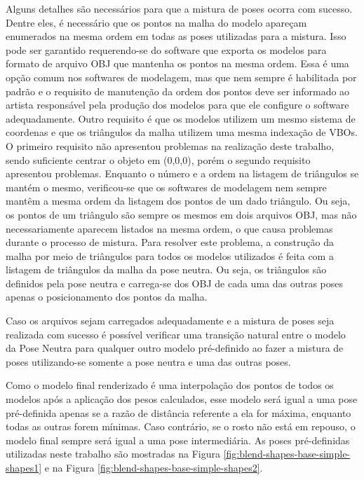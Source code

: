 Alguns detalhes são necessários para que a mistura de poses ocorra com sucesso.
Dentre eles, é necessário que os pontos na malha do modelo apareçam enumerados
na mesma ordem em todas as poses utilizadas para a mistura. Isso pode ser
garantido requerendo-se do software que exporta os modelos para formato de
arquivo OBJ que mantenha os pontos na mesma ordem. Essa é uma opção comum nos
softwares de modelagem, mas que nem sempre é habilitada por padrão e o requisito
de manutenção da ordem dos pontos deve ser informado ao artista responsável pela
produção dos modelos para que ele configure o software adequadamente. Outro
requisito é que os modelos utilizem um mesmo sistema de coordenas e que os
triângulos da malha utilizem uma mesma indexação de VBOs. O primeiro requisito
não apresentou problemas na realização deste trabalho, sendo suficiente centrar
o objeto em (0,0,0), porém o segundo requisito apresentou problemas. Enquanto o
número e a ordem na listagem de triângulos se mantém o mesmo, verificou-se que
os softwares de modelagem nem sempre mantêm a mesma ordem da listagem dos pontos
de um dado triângulo. Ou seja, os pontos de um triângulo são sempre os mesmos em
dois arquivos OBJ, mas não necessariamente aparecem listados na mesma ordem, o
que causa problemas durante o processo de mistura. Para resolver este problema,
a construção da malha por meio de triângulos para todos os modelos utilizados é
feita com a listagem de triângulos da malha da pose neutra. Ou seja, os
triângulos são definidos pela pose neutra e carrega-se dos OBJ de cada uma das
outras poses apenas o posicionamento dos pontos da malha.

Caso os arquivos sejam carregados adequadamente e a mistura de poses seja
realizada com sucesso é possível verificar uma transição natural entre o modelo
da Pose Neutra para qualquer outro modelo pré-definido ao fazer a mistura de
poses utilizando-se somente a pose neutra e uma das outras poses.

Como o modelo final renderizado é uma interpolação dos pontos de todos os
modelos após a aplicação dos pesos calculados, esse modelo será igual a uma pose
pré-definida apenas se a razão de distância referente a ela for máxima, enquanto
todas as outras forem mínimas. Caso contrário, se o rosto não está em repouso, o
modelo final sempre será igual a uma pose intermediária. As poses pré-definidas
utilizadas neste trabalho são mostradas na Figura
\ref{fig:blend-shapes-base-simple-shapes1} e na Figura
\ref{fig:blend-shapes-base-simple-shapes2}.



